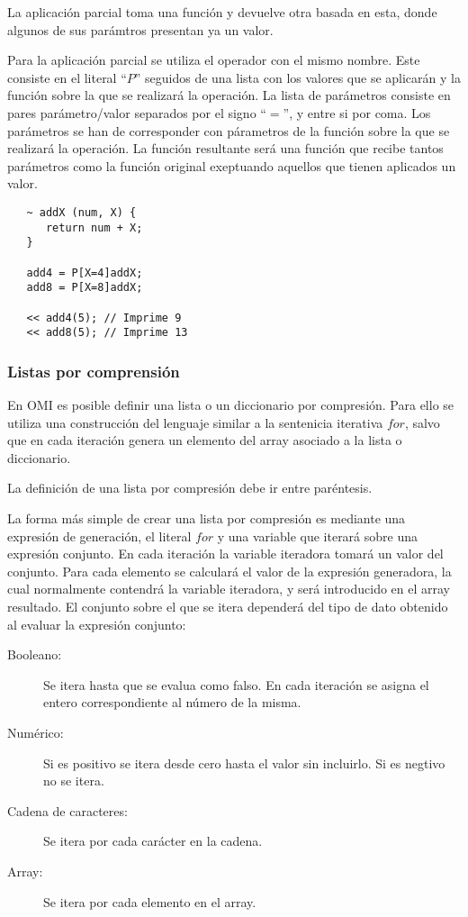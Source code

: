 La aplicación parcial toma una función y devuelve otra basada en esta, donde algunos de sus parámtros presentan ya un valor.

Para la aplicación parcial se utiliza el operador con el mismo nombre. Este consiste en el literal ``$P$'' seguidos de 
una lista con los valores que se aplicarán y la función sobre la que se realizará la operación. La lista de parámetros consiste 
en pares parámetro/valor separados por el signo ``$=$'', y entre si por coma. Los parámetros se han de corresponder con párametros de
la función sobre la que se realizará la operación. La función resultante será una función que recibe tantos parámetros como la función original
exeptuando aquellos que tienen aplicados un valor. \\ 

\begin{lstlisting}
   ~ addX (num, X) {
      return num + X;
   }
   
   add4 = P[X=4]addX;
   add8 = P[X=8]addX;
   
   << add4(5); // Imprime 9
   << add8(5); // Imprime 13
\end{lstlisting}

\subsubsection{Listas por comprensión}
En OMI es posible definir una lista o un diccionario por compresión. Para ello se utiliza una construcción del
lenguaje similar a la sentenicia iterativa $for$, salvo que en cada iteración genera un elemento del array 
asociado a la lista o diccionario. 

La definición de una lista por compresión debe ir entre paréntesis.

La forma más simple de crear una lista por compresión es mediante una expresión de generación, 
el literal $for$ y una variable que iterará sobre una expresión conjunto. En cada iteración la variable 
iteradora tomará un valor del conjunto. Para cada elemento se calculará el valor de 
la expresión generadora, la cual normalmente contendrá la variable iteradora, y será introducido en 
el array resultado. El conjunto sobre el que se itera dependerá del tipo de dato obtenido al evaluar la expresión conjunto:

\begin {description}
\item [Booleano:] Se itera hasta que se evalua como falso. En cada iteración se asigna el entero correspondiente al número de la misma.
\item [Numérico:] Si es positivo se itera desde cero hasta el valor sin incluirlo. Si es negtivo no se itera.
\item [Cadena de caracteres:] Se itera por cada carácter en la cadena.
\item [Array:] Se itera por cada elemento en el array.
\end{description}

